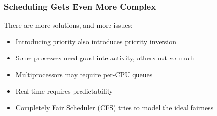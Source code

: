   \begin{frame}
    \frametitle{Scheduling Gets Even More Complex}

    There are more solutions, and more issues:
    \begin{itemize}
      \item Introducing priority also introduces priority inversion
      \item Some processes need good interactivity, others not so much
      \item Multiprocessors may require per-CPU queues
      \item Real-time requires predictability
      \item Completely Fair Scheduler (CFS) tries to model the ideal fairness
    \end{itemize}
  \end{frame}

